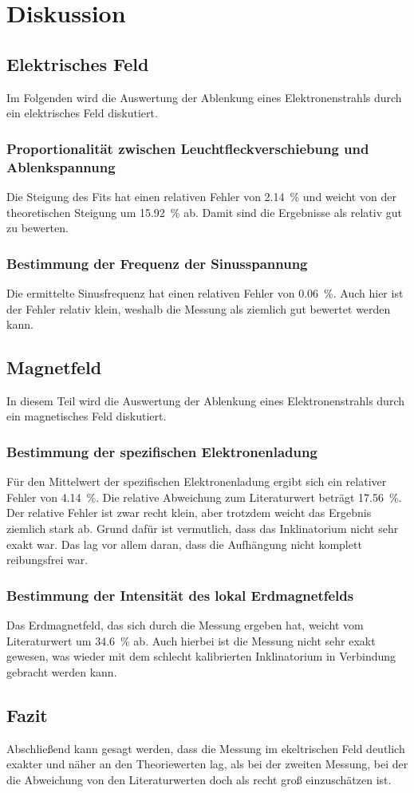 \section{Diskussion}
\label{sec:Diskussion}

\subsection{Elektrisches Feld}
Im Folgenden wird die Auswertung der Ablenkung eines Elektronenstrahls durch ein elektrisches Feld diskutiert. 

\subsubsection{Proportionalität zwischen Leuchtfleckverschiebung und Ablenkspannung}
Die Steigung des Fits hat einen relativen Fehler von \SI{2.14}{\percent} und weicht von der 
theoretischen Steigung um \SI{15.92}{\percent} ab. Damit sind die Ergebnisse als relativ gut zu bewerten.

\subsubsection{Bestimmung der Frequenz der Sinusspannung}
Die ermittelte Sinusfrequenz hat einen relativen Fehler von \SI{0.06}{\percent}. Auch hier ist der Fehler relativ klein, 
weshalb die Messung als ziemlich gut bewertet werden kann. 


\subsection{Magnetfeld}
In diesem Teil wird die Auswertung der Ablenkung eines Elektronenstrahls durch ein magnetisches Feld diskutiert. 

\subsubsection{Bestimmung der spezifischen Elektronenladung}
Für den Mittelwert der spezifischen Elektronenladung ergibt sich ein relativer Fehler von \SI{4.14}{\percent}. Die relative 
Abweichung zum Literaturwert beträgt \SI{17.56}{\percent}. Der relative Fehler ist zwar recht klein, aber trotzdem weicht das Ergebnis 
ziemlich stark ab. 
Grund dafür ist vermutlich, dass das Inklinatorium nicht sehr exakt war. Das lag vor allem daran, dass die Aufhängung nicht komplett reibungsfrei war. 


\subsubsection{Bestimmung der Intensität des lokal Erdmagnetfelds}
Das Erdmagnetfeld, das sich durch die Messung ergeben hat, weicht vom Literaturwert um \SI{34.6}{\percent} ab. Auch hierbei ist die Messung 
nicht sehr exakt gewesen, was wieder mit dem schlecht kalibrierten Inklinatorium in Verbindung gebracht werden kann. 

\subsection{Fazit}
Abschließend kann gesagt werden, dass die Messung im ekeltrischen Feld deutlich exakter und näher an den Theoriewerten lag, als bei der 
zweiten Messung, bei der die Abweichung von den Literaturwerten doch als recht groß einzuschätzen ist. 
